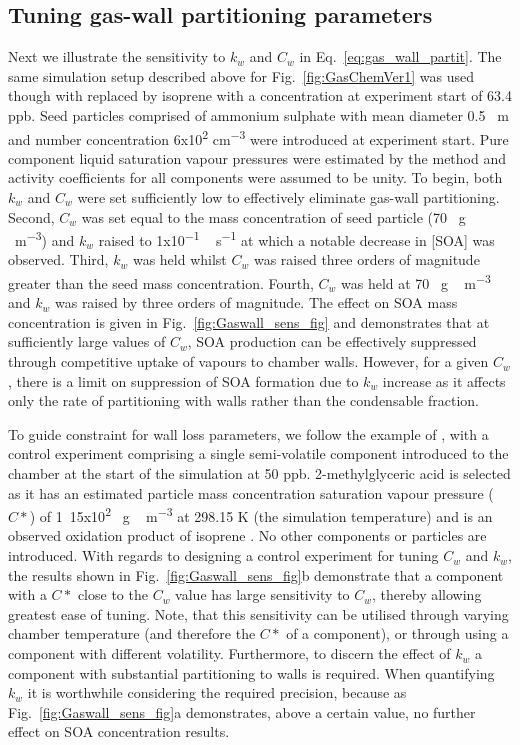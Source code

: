 \documentclass[gmd, manuscript]{copernicus}
\begin{document}
\subsection{Tuning gas-wall partitioning parameters}

Next we illustrate the sensitivity to $k_{w}$ and $C_{w}$ in Eq.~\ref{eq:gas_wall_partit}.  The same simulation setup described above for Fig.~\ref{fig:GasChemVer1} was used though with  replaced by isoprene with a concentration at experiment start of 63.4 \unit{ppb}.  Seed particles comprised of ammonium sulphate with mean diameter 0.5 \unit{\mu m} and number concentration \unit{6x10^{2}} \unit{cm^{-3}} were introduced at experiment start.  Pure component liquid saturation vapour pressures were estimated by the \citet{Nannoolal2008} method and activity coefficients for all components were assumed to be unity.  To begin, both $k_{w}$ and $C_{w}$ were set sufficiently low to effectively eliminate gas-wall partitioning.  Second, $C_{w}$ was set equal to the mass concentration of seed particle (70 \unit{\mu g\,m^{-3}}) and $k_{w}$ raised to \unit{1x10^{-1}\, s^{-1}} at which a notable decrease in [SOA] was observed.  Third, $k_{w}$ was held whilst $C_{w}$ was raised three orders of magnitude greater than the seed mass concentration.  Fourth, $C_{w}$ was held at 70 \unit{\mu g\,m^{-3}} and $k_{w}$ was raised by three orders of magnitude.  The effect on SOA mass concentration is given in Fig.~\ref{fig:Gaswall_sens_fig} and demonstrates that at sufficiently large values of $C_{w}$, SOA production can be effectively suppressed through competitive uptake of vapours to chamber walls.  However, for a given $C_{w}$, there is a limit on suppression of SOA formation due to $k_{w}$ increase as it affects only the rate of partitioning with walls rather than the condensable fraction.

To guide constraint for wall loss parameters, we follow the example of \citet{Matsunaga2010}, with a control experiment comprising a single semi-volatile component introduced to the chamber at the start of the simulation at 50 ppb.  2-methylglyceric acid is selected as it has an estimated particle mass concentration saturation vapour pressure ($C*$) of \unit{1.15x10^2} \unit{\mu g\,m^{-3}} at 298.15 K (the simulation temperature) and is an observed oxidation product of isoprene \citep{Surratt2006}.  No other components or particles are introduced.  With regards to designing a control experiment for tuning $C_{w}$ and $k_{w}$, the results shown in Fig.~\ref{fig:Gaswall_sens_fig}b demonstrate that a component with a $C*$ close to the $C_{w}$ value has large sensitivity to $C_{w}$, thereby allowing greatest ease of tuning.  Note, that this sensitivity can be utilised through varying chamber temperature (and therefore the $C*$ of a component), or through using a component with different volatility.  Furthermore, to discern the effect of $k_{w}$ a component with substantial partitioning to walls is required.  When quantifying $k_{w}$ it is worthwhile considering the required precision, because as Fig.~\ref{fig:Gaswall_sens_fig}a demonstrates, above a certain value, no further effect on SOA concentration results.
\end{document}
